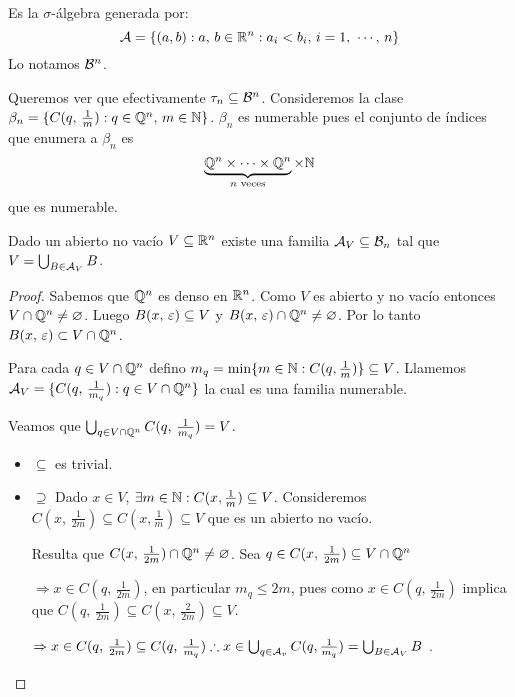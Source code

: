 \clearpage

\begin{definition}
    Es la $\sigma$-álgebra generada por:
    \begin{equation*}
        \mathcal{A} = \{ (a, b) : a\text{, } b \in \mathbb{R}^n : a_i < b_i \text{, } i = 1\text{, } \cdots \text{, } n \}
    \end{equation*}
    Lo notamos $\mathcal{B}^n$.
\end{definition}

Queremos ver que efectivamente $\tau_n \subseteq \mathcal{B}^n$.
Consideremos la clase $\beta_n = \{ C(q\text{, } \frac{1}{m}) : q \in \mathbb{Q}^n\text{, } m \in \mathbb{N} \}$.
$\beta_n$ es numerable pues el conjunto de índices que enumera a $\beta_n$ es
\[ \underbrace{\mathbb{Q}^n \times \cdots \times \mathbb{Q}^n}_{n \text{ veces}} \times \mathbb{N} \] que es numerable.

\begin{prop}
    Dado un abierto no vacío $V \subseteq \mathbb{R}^n$ existe una familia $\mathcal{A}_V \subseteq \mathcal{B}_n$ tal que
    $V = \bigcup_{B \in \mathcal{A}_V} B$.

    \begin{proof}
        Sabemos que $\mathbb{Q}^n$ es denso en $\mathbb{R}^n$. Como $V$ es abierto y no vacío entonces $V \cap \mathbb{Q}^n \neq \varnothing$.
        Luego $B(x\text{, } \varepsilon) \subseteq V$ y $B(x\text{, } \varepsilon) \cap \mathbb{Q}^n \neq \varnothing$. Por lo tanto $B(x\text{, } \varepsilon) \subset V \cap \mathbb{Q}^n$.

        Para cada $q \in V \cap \mathbb{Q}^n$ defino $m_q = \min\{ m \in \mathbb{N} : C(q, \frac{1}{m}) \} \subseteq V$.
        Llamemos $\mathcal{A}_V = \{ C(q\text{, } \frac{1}{m_q}) : q \in V \cap \mathbb{Q}^n \}$ la cual es una familia numerable.

        Veamos que $\bigcup_{q \in V \cap \mathbb{Q}^n} C(q\text{, } \frac{1}{m_q}) = V$.
        \begin{itemize}
            \item $\subseteq$ es trivial.
            \item $\supseteq$ Dado $x \in V$, $\exists m \in \mathbb{N} : C(x, \frac{1}{m}) \subseteq V$. Consideremos
                  $C(x\text{, } \frac{1}{2m}) \subseteq C(x, \frac{1}{m}) \subseteq V$ que es un abierto no vacío.

                  Resulta que $C(x\text{, } \frac{1}{2m}) \cap \mathbb{Q}^n \neq \varnothing$.
                  Sea $q \in C(x\text{, } \frac{1}{2m}) \subseteq V \cap \mathbb{Q}^n$

                  $\Rightarrow x \in C(q\text{, } \frac{1}{2m})$, en particular $m_q \leq 2m$, pues como $x \in C(q\text{, } \frac{1}{2m})$
                  implica que $C(q\text{, } \frac{1}{2m}) \subseteq C(x\text{, } \frac{2}{2m}) \subseteq V$.

                  $\Rightarrow x \in C(q\text{, } \frac{1}{2m}) \subseteq C(q\text{, } \frac{1}{m_q}) \therefore x \in \bigcup_{q \in \mathcal{A}_v} C(q, \frac{1}{m_q}) = \bigcup_{B \in \mathcal{A}_V} B$ .
        \end{itemize}
    \end{proof}
\end{prop}

